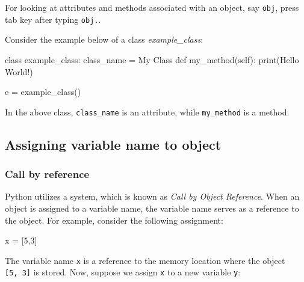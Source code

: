 \documentclass[
  letterpaper,
  DIV=11,
  numbers=noendperiod]{scrreprt}
\newenvironment{Shaded}{\begin{snugshade}}{\end{snugshade}}
\newcommand{\BuiltInTok}[1]{\textcolor[rgb]{0.00,0.23,0.31}{#1}}
\newcommand{\DecValTok}[1]{\textcolor[rgb]{0.68,0.00,0.00}{#1}}
\newcommand{\KeywordTok}[1]{\textcolor[rgb]{0.00,0.23,0.31}{#1}}
\newcommand{\NormalTok}[1]{\textcolor[rgb]{0.00,0.23,0.31}{#1}}
\newcommand{\OperatorTok}[1]{\textcolor[rgb]{0.37,0.37,0.37}{#1}}
\newcommand{\StringTok}[1]{\textcolor[rgb]{0.13,0.47,0.30}{#1}}
\newcommand{\VariableTok}[1]{\textcolor[rgb]{0.07,0.07,0.07}{#1}}
\begin{document}
For looking at attributes and methods associated with an object, say
\texttt{obj}, press tab key after typing \texttt{obj.}.

Consider the example below of a class \emph{example\_class}:

\begin{Shaded}
\begin{Highlighting}[]
\KeywordTok{class}\NormalTok{ example\_class:}
\NormalTok{    class\_name }\OperatorTok{=} \StringTok{\textquotesingle{}My Class\textquotesingle{}}
    \KeywordTok{def}\NormalTok{ my\_method(}\VariableTok{self}\NormalTok{):}
        \BuiltInTok{print}\NormalTok{(}\StringTok{\textquotesingle{}Hello World!\textquotesingle{}}\NormalTok{)}

\NormalTok{e }\OperatorTok{=}\NormalTok{ example\_class()}
\end{Highlighting}
\end{Shaded}

In the above class, \texttt{class\_name} is an attribute, while
\texttt{my\_method} is a method.

\hypertarget{assigning-variable-name-to-object}{%
\subsection{Assigning variable name to
object}\label{assigning-variable-name-to-object}}

\hypertarget{call-by-reference}{%
\subsubsection{Call by reference}\label{call-by-reference}}

Python utilizes a system, which is known as \emph{Call by Object
Reference}. When an object is assigned to a variable name, the variable
name serves as a reference to the object. For example, consider the
following assignment:

\begin{Shaded}
\begin{Highlighting}[]
\NormalTok{x }\OperatorTok{=}\NormalTok{ [}\DecValTok{5}\NormalTok{,}\DecValTok{3}\NormalTok{]}
\end{Highlighting}
\end{Shaded}

The variable name \texttt{x} is a reference to the memory location where
the object \texttt{{[}5,\ 3{]}} is stored. Now, suppose we assign
\texttt{x} to a new variable \texttt{y}:
\end{document}
